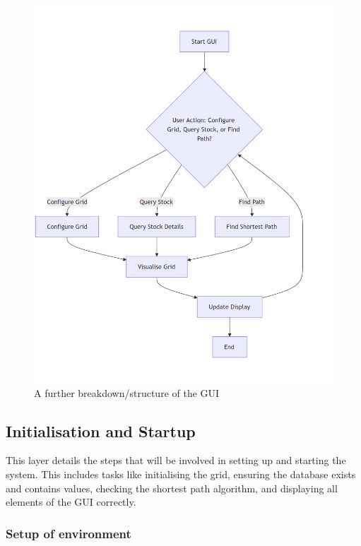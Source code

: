 \begin{figure}[!htbp]
	\centering
	\includegraphics[width=1\linewidth]{Images/guioutline.png}
	\caption{A further breakdown/structure of the GUI}
\end{figure}


\newpage

\subsection{Initialisation and Startup}

This layer details the steps that will be involved in setting up and starting the system. This includes tasks like initialising the grid, ensuring the database exists and contains values, checking the shortest path algorithm, and displaying all elements of the GUI correctly.

\subsubsection{Setup of environment}

